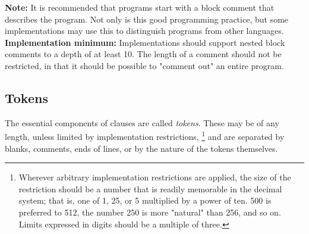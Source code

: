 \begin{shaded}\noindent
  \textbf{Note: }It is recommended that \nr{} programs start with a block comment
that describes the program.
Not only is this good programming practice, but some implementations may
use this to distinguish \nr{} programs from other languages.
 \textbf{Implementation minimum:} Implementations should support
nested block comments to a depth of at least 10.
The length of a comment should not be restricted, in that it should be
possible to "comment out" an entire program.
\end{shaded}\indent
\subsection{Tokens}\label{reftokens}
 The essential components of clauses are called \emph{tokens}.
These may be of any length, unless limited by implementation
restrictions,
\footnote{
Wherever arbitrary implementation restrictions are applied, the size of
the restriction should be a number that is readily memorable in the
decimal system; that is, one of 1, 25, or 5 multiplied by a power of
ten.
500 is preferred to 512, the number 250 is more "natural" than
256, and so on.  Limits expressed in digits should be a multiple of
three.
}
and are separated by blanks, comments, ends of lines, or by the nature
of the tokens themselves.
 
